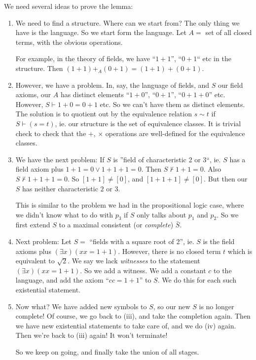 \documentclass[a4paper]{article}
\begin{document}
We need several ideas to prove the lemma:
\begin{enumerate}
  \item We need to find a structure. Where can we start from? The only thing we have is the language. So we start form the language. Let $A =$ set of all closed terms, with the obvious operations.

    For example, in the theory of fields, we have ``$1 + 1$'', ``$0 + 1$`` etc in the structure. Then $(1 + 1) +_A (0 + 1) = (1 + 1) + (0 + 1)$.
  \item However, we have a problem. In, say, the language of fields, and $S$ our field axioms, our $A$ has distinct elements ``$1 + 0$'', ``$0 + 1$'', ``$0 + 1 + 0$'' etc. However, $S\vdash 1 + 0 = 0 + 1$ etc. So we can't have them as distinct elements. The solution is to quotient out by the equivalence relation $s\sim t$ if $S\vdash (s = t)$, ie. our structure is the set of equivalence classes. It is trivial check to check that the $+$, $\times$ operations are well-defined for the equivalence classes.
  \item We have the next problem: If $S$ is ''field of characteristic 2 or 3``, ie. $S$ has a field axiom plus $1 + 1 = 0 \vee 1 + 1 + 1 = 0$. Then $S\not\vdash 1 + 1 = 0$. Also $S\not\vdash 1 + 1 + 1 = 0$. So $[1 + 1] \not = [0]$, and $[1 + 1 + 1] \not= [0]$. But then our $S$ has neither characteristic $2$ or $3$.

    This is similar to the problem we had in the propositional logic case, where we didn't know what to do with $p_3$ if $S$ only talks about $p_1$ and $p_2$. So we first extend $S$ to a maximal consistent (or \emph{complete}) $\bar S$.

  \item Next problem: Let $S =$ ``fields with a square root of 2'', ie. $S$ is the field axioms plus $(\exists x)(xx = 1 + 1)$. However, there is no closed term $t$ which is equivalent to $\sqrt{2}$. We say we lack \emph{witnesses} to the statement $(\exists x)(xx = 1 + 1)$. So we add a witness. We add a constant $c$ to the language, and add the axiom ``$cc = 1 + 1$'' to $S$. We do this for each such existential statement.

  \item Now what? We have added new symbols to $S$, so our new $S$ is no longer complete! Of course, we go back to (iii), and take the completion again. Then we have new existential statements to take care of, and we do (iv) again. Then we're back to (iii) again! It won't terminate!

      So we keep on going, and finally take the union of all stages.
  \end{enumerate}
\end{document}
